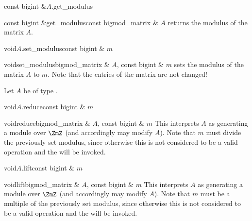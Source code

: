 \begin{cfcode}{const bigint &}{$A$.get_modulus}{}
\end{cfcode}

\begin{fcode}{const bigint &}{get_modulus}{const bigmod_matrix & $A$}
  returns the modulus of the matrix $A$.
\end{fcode}

\begin{fcode}{void}{$A$.set_modulus}{const bigint & $m$}
\end{fcode}

\begin{fcode}{void}{set_modulus}{bigmod_matrix & $A$, const bigint & $m$}
  sets the modulus of the matrix $A$ to $m$.  Note that the entries of the matrix are not
  changed!
\end{fcode}




Let $A$ be of type .

\begin{fcode}{void}{$A$.reduce}{const bigint & $m$}
\end{fcode}

\begin{fcode}{void}{reduce}{bigmod_matrix & $A$, const bigint & $m$}
  This interprets $A$ as generating a module over $\ZmZ$ (and accordingly may modify $A$).  Note
  that $m$ must divide the previously set modulus, since otherwise this is not considered to be
  a valid operation and the \LEH will be invoked.
\end{fcode}

\begin{fcode}{void}{$A$.lift}{const bigint & $m$}
\end{fcode}

\begin{fcode}{void}{lift}{bigmod_matrix & $A$, const bigint & $m$}
  This interprets $A$ as generating a module over $\ZmZ$ (and accordingly may modify $A$).  Note
  that $m$ must be a multiple of the previously set modulus, since otherwise this is not
  considered to be a valid operation and the \LEH will be invoked.
\end{fcode}





